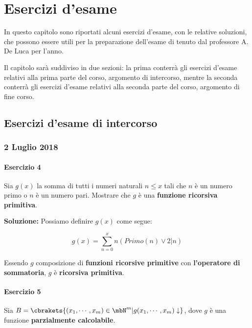 \chapter{Esercizi d'esame}

In questo capitolo sono riportati alcuni esercizi d'esame, con le relative soluzioni, che possono essere utili per la preparazione dell'esame di \documentname{} tenuto dal professore A. De Luca per l'anno\documentyear.

Il capitolo sarà suddiviso in due sezioni: la prima conterrà gli esercizi d'esame relativi alla prima parte del corso, argomento di intercorso, mentre la seconda conterrà gli esercizi d'esame relativi alla seconda parte del corso, argomento di fine corso.

\section{Esercizi d'esame di intercorso}

\subsection{2 Luglio 2018}

\subsubsection{Esercizio 4}

Sia \(g(x)\) la somma di tutti i numeri naturali \(n\leq x\) tali che \(n\) è un numero primo o \(n\) è un numero pari. Mostrare che \(g\) è una \textbf{funzione ricorsiva primitiva}.

\textbf{Soluzione:} Possiamo definire \(g(x)\) come segue:

\begin{equation}
  g(x) = \sum_{n=0}^{x} n(Primo(n) \lor 2\vert n)
\end{equation}

Essendo \(g\) composizione di \textbf{funzioni ricorsive primitive} con \textbf{l'operatore di sommatoria}, \(g\) è \textbf{ricorsiva primitiva}.

\subsubsection{Esercizio 5}

Sia \(B=\cbrakets{(x_1, \cdots, x_m) \in \mbN^m \vert g(x_1, \cdots, x_m)\downarrow}\), dove \(g\) è una funzione \textbf{parzialmente calcolabile}.


